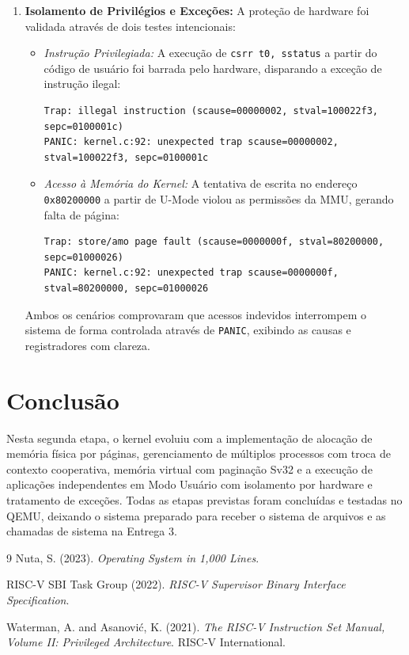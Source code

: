 \documentclass[12pt]{article}
\begin{document}
\begin{enumerate}
    \item \textbf{Isolamento de Privilégios e Exceções:} A proteção de hardware foi validada através de dois testes intencionais:
    \begin{itemize}
        \item \textit{Instrução Privilegiada:} A execução de \texttt{csrr t0, sstatus} a partir do código de usuário foi barrada pelo hardware, disparando a exceção de instrução ilegal:
\begin{verbatim}
Trap: illegal instruction (scause=00000002, stval=100022f3, sepc=0100001c)
PANIC: kernel.c:92: unexpected trap scause=00000002, stval=100022f3, sepc=0100001c
\end{verbatim}
        \item \textit{Acesso à Memória do Kernel:} A tentativa de escrita no endereço \texttt{0x80200000} a partir de U-Mode violou as permissões da MMU, gerando falta de página:
\begin{verbatim}
Trap: store/amo page fault (scause=0000000f, stval=80200000, sepc=01000026)
PANIC: kernel.c:92: unexpected trap scause=0000000f, stval=80200000, sepc=01000026
\end{verbatim}
    \end{itemize}
    Ambos os cenários comprovaram que acessos indevidos interrompem o sistema de forma controlada através de \texttt{PANIC}, exibindo as causas e registradores com clareza.
\end{enumerate}

\section{Conclusão}

Nesta segunda etapa, o kernel evoluiu com a implementação de alocação de memória física por páginas, gerenciamento de múltiplos processos com troca de contexto cooperativa, memória virtual com paginação Sv32 e a execução de aplicações independentes em Modo Usuário com isolamento por hardware e tratamento de exceções. Todas as etapas previstas foram concluídas e testadas no QEMU, deixando o sistema preparado para receber o sistema de arquivos e as chamadas de sistema na Entrega 3.

\begin{thebibliography}{9}
Nuta, S. (2023). \textit{Operating System in 1,000 Lines}.

RISC-V SBI Task Group (2022). \textit{RISC-V Supervisor Binary Interface Specification}.

Waterman, A. and Asanovi\'{c}, K. (2021). \textit{The RISC-V Instruction Set Manual, Volume II: Privileged Architecture}. RISC-V International.
\end{thebibliography}
\end{document}
